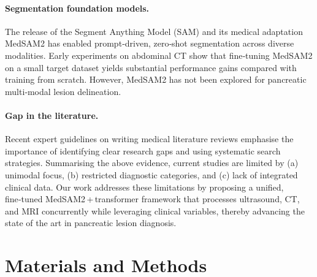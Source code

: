\documentclass[a4paper, fleqn]{cas-dc}
\begin{document}
    \paragraph{Segmentation foundation models.}
    The release of the Segment Anything Model (SAM) and its medical adaptation MedSAM2\citep{Ma2023}
    has enabled prompt‐driven, zero‑shot segmentation across diverse modalities.
    Early experiments on abdominal CT show that fine‑tuning MedSAM2 on a small target
    dataset yields substantial performance gains compared with training from scratch.
    However, MedSAM2 has not been explored for pancreatic multi‑modal lesion delineation.

    \paragraph{Gap in the literature.}
    Recent expert guidelines on writing medical literature reviews emphasise the
    importance of identifying clear research gaps and using systematic search
    strategies\citep{Samwell2024}. Summarising the above evidence, current
    studies are limited by (a) unimodal focus, (b) restricted diagnostic categories,
    and (c) lack of integrated clinical data. Our work addresses these limitations
    by proposing a unified, fine‑tuned MedSAM2\,+\,transformer framework that
    processes ultrasound, CT, and MRI concurrently while leveraging clinical
    variables, thereby advancing the state of the art in pancreatic lesion diagnosis.


    \section{Materials and Methods}
    \label{sec:methods}
\end{document}
